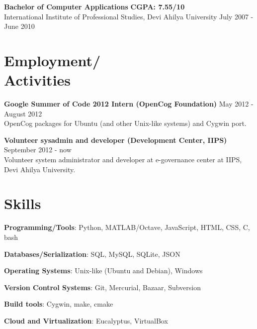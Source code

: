 \documentclass[margin,line]{resume}
\begin{document}
\begin{resume}
	\begin{list2}
	\item \textbf{Bachelor of Computer Applications} \hspace{70mm} \textbf{CGPA: 7.55/10} \\ International Institute of Professional Studies, Devi Ahilya University \hspace{20mm} July 2007 - June 2010
	\end{list2}

    \section{\mysidestyle Employment/ \\ Activities}

    \begin{list2}
	\item \textbf{Google Summer of Code 2012 Intern (OpenCog Foundation)} \hspace{15mm} May 2012 - August 2012 \\ OpenCog packages for Ubuntu (and other Unix-like systems) and Cygwin port.
	\item \textbf{Volunteer sysadmin and developer (Development Center, IIPS)} \hspace{12mm} September 2012 - now \\ Volunteer system administrator and developer at e-governance center at IIPS, Devi Ahilya University.
	\end{list2}

    \section{\mysidestyle Skills} 

    \begin{list2}
	\item \textbf{Programming/Tools}: \hspace{11.8mm} Python, MATLAB/Octave, JavaScript, HTML, CSS, C, bash
	\item \textbf{Databases/Serialization}: \hspace{5.7mm} SQL, MySQL, SQLite,	JSON
	\item \textbf{Operating Systems}: \hspace{13.8mm} Unix-like (Ubuntu and Debian), Windows
	\item \textbf{Version Control Systems}: \hspace{3.5mm} Git, Mercurial, Bazaar, Subversion
	\item \textbf{Build tools}: \hspace{28mm} Cygwin, make, cmake
	\item \textbf{Cloud and Virtualization}: \hspace{3mm} Eucalyptus, VirtualBox
	\end{list2}


\end{resume}
\end{document}
